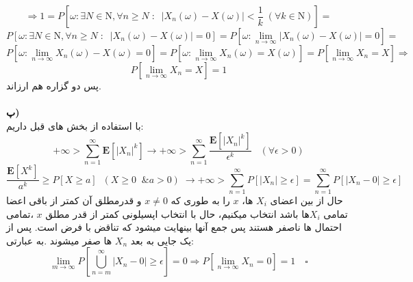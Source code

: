 \[
\Longrightarrow 1=P[\omega : \exists N \in \mathrm{N} , \forall n \ge N \; : \;\; |X_n(\omega)-X(\omega)|< \frac{1}{k}\;(\forall k \in \mathrm{N})]=
\]
\[
P[\omega : \exists N \in \mathrm{N} , \forall n \ge N \; : \;\; |X_n(\omega)-X(\omega)|=0]=P[\omega : \lim_{n \longrightarrow \infty} |X_n(\omega)-X(\omega)|=0]=
\]
\[
P[\omega : \lim_{n \longrightarrow \infty} X_n(\omega)-X(\omega)=0]=P[\omega : \lim_{n \longrightarrow \infty} X_n(\omega)=X(\omega)]=P[ \lim_{n\longrightarrow \infty} X_n=X]\Longrightarrow
\]
\[
P[ \lim_{n\longrightarrow \infty} X_n=X]=1
\]
پس دو گزاره هم ارزاند.
\\\\
\textbf{پ)}\\
با استفاده از بخش های قبل داریم:
\[
+\infty > \sum_{n=1}^{\infty} \mathbf{E}[|X_n|^k] 
\longrightarrow +\infty > \sum_{n=1}^{\infty} \frac{\mathbf{E}[|X_n|^k]}{\epsilon^k}\;\;\; (\forall \epsilon>0)
\]
\[
 \frac{\mathbf{E}[X^k]}{a^k} \ge  P[X \ge a] \;\;(X\ge 0 \;\; \& a>0)\; \longrightarrow +\infty> \sum_{n=1}^{\infty} P[|X_n| \ge \epsilon]= \sum_{n=1}^{\infty} P[|X_n-0| \ge \epsilon]\]
حال از بین اعضای $X_i$ ها،  $x$ را به طوری که $x\neq 0$ و قدرمطلق آن کمتر از باقی اعضا  تمامی $X_i$ها باشد انتخاب میکنیم، حال با انتخاب اپسیلونی کمتر از قدر مطلق $x$  ،تمامی احتمال ها ناصفر هستند پس جمع آنها بینهایت میشود که تناقض با فرض است. پس از یک جایی به بعد $X_n$ ها صفر میشوند .به عبارتی:
\[
\lim_{m \longrightarrow \infty} P[\bigcup_{n=m}^{\infty} {|X_n-0| \ge \epsilon}] =0 \Longrightarrow P[\lim_{n \longrightarrow \infty} X_n=0]=1
 \quad \square
 \]